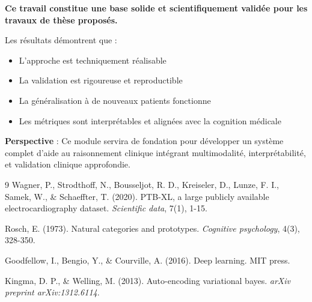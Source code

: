 \documentclass[12pt,a4paper]{article}
\begin{document}
\textbf{Ce travail constitue une base solide et scientifiquement validée pour les travaux de thèse proposés.}

Les résultats démontrent que :
\begin{itemize}
    \item L'approche est techniquement réalisable
    \item La validation est rigoureuse et reproductible
    \item La généralisation à de nouveaux patients fonctionne
    \item Les métriques sont interprétables et alignées avec la cognition médicale
\end{itemize}

\textbf{Perspective} : Ce module servira de fondation pour développer un système complet d'aide au raisonnement clinique intégrant multimodalité, interprétabilité, et validation clinique approfondie.

\begin{thebibliography}{9}
Wagner, P., Strodthoff, N., Bousseljot, R. D., Kreiseler, D., Lunze, F. I., Samek, W., \& Schaeffter, T. (2020).
PTB-XL, a large publicly available electrocardiography dataset.
\textit{Scientific data}, 7(1), 1-15.

Rosch, E. (1973).
Natural categories and prototypes.
\textit{Cognitive psychology}, 4(3), 328-350.

Goodfellow, I., Bengio, Y., \& Courville, A. (2016).
Deep learning.
MIT press.

Kingma, D. P., \& Welling, M. (2013).
Auto-encoding variational bayes.
\textit{arXiv preprint arXiv:1312.6114}.
\end{thebibliography}
\end{document}

